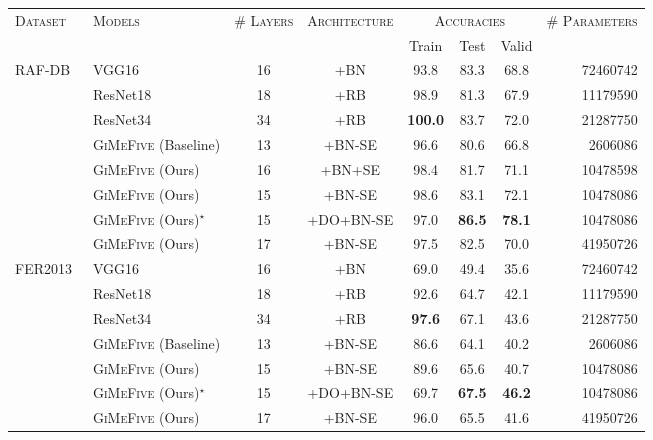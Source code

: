 \begin{table}[ht]
  \centering
  \begin{tabular}{@{}llcccccr@{}}
    \toprule 
    \multirow{2}{*}{\textsc{Dataset}}&\multirow{2}{*}{\textsc{Models}}&\multirow{2}{*}{\textsc{\# Layers}}&\multirow{2}{*}{\textsc{Architecture}} & \multicolumn{3}{c}{\textsc{Accuracies}} & \multirow{2}{*}{\textsc{\# Parameters}} \\
    \cline{5-7}
    &&&& Train & Test & Valid  &  \\
    \midrule
    \multirow{8}{*}{RAF-DB~\cite{li_reliable_2017,li2019reliable}} &VGG16~\cite{SimonyanZ14a} & 16 &+BN&93.8&83.3&68.8&72460742\\ 
    & ResNet18~\cite{HeZRS16} & 18 & +RB  & 98.9 & 81.3 & 67.9 & 11179590 \\
    & ResNet34~\cite{HeZRS16} & 34 & +RB  & \textbf{100.0} & 83.7 & 72.0 & 21287750 \\
    &\textsc{GiMeFive} (Baseline) & 13 & +BN-SE & 96.6 & 80.6 & 66.8 & 2606086 \\ 
    &\textsc{GiMeFive} (Ours) & 16 & +BN+SE & 98.4 & 81.7 & 71.1 & 10478598 \\
    &\textsc{GiMeFive} (Ours) & 15 & +BN-SE & 98.6 & 83.1 & 72.1 & 10478086 \\
    &\textsc{GiMeFive} (Ours)\textcolor{LMUGreen}{$^\star$} & 15 & +DO+BN-SE & 97.0 & \textbf{86.5} & \textbf{78.1} & 10478086 \\
    &\textsc{GiMeFive} (Ours) & 17 & +BN-SE & 97.5 & 82.5 & 70.0 & 41950726 \\ 
    \midrule
    \multirow{7}{*}{FER2013~\cite{BarsoumZCZ16}} & VGG16~\cite{SimonyanZ14a} & 16 & +BN & 69.0 & 49.4 & 35.6 & 72460742 \\
    & ResNet18~\cite{HeZRS16} & 18 & +RB  & 92.6 & 64.7 & 42.1 & 11179590 \\
    & ResNet34~\cite{HeZRS16} & 34 & +RB  & \textbf{97.6} & 67.1 & 43.6 & 21287750 \\
    & \textsc{GiMeFive} (Baseline) & 13 & +BN-SE & 86.6 & 64.1 & 40.2 & 2606086 \\
    &\textsc{GiMeFive} (Ours) & 15 & +BN-SE & 89.6 & 65.6 & 40.7 & 10478086 \\
    &\textsc{GiMeFive} (Ours)\textcolor{LMUGreen}{$^\star$} & 15 & +DO+BN-SE & 69.7 & \textbf{67.5} & \textbf{46.2} & 10478086 \\
    &\textsc{GiMeFive} (Ours) & 17 & +BN-SE & 96.0 & 65.5 & 41.6 & 41950726 \\

\end{tabular}
\end{table}
